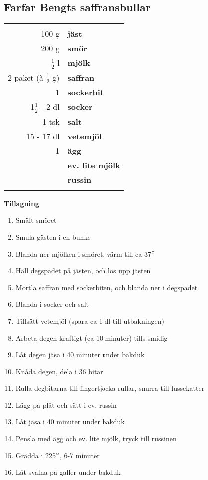 \clearpage

\subsection{Farfar Bengts saffransbullar}

\begin{table}[H]
	\begin{tabular}{rl}
	\hline
	&\\
		100 g & \textbf{jäst} \\
		200 g & \textbf{smör} \\
		$\frac{1}{2}$ l & \textbf{mjölk} \\
		2 paket (à $\frac{1}{2}$ g) & \textbf{saffran} \\
		1 & \textbf{sockerbit} \\
		1$\frac{1}{2}$ - 2 dl & \textbf{socker} \\
		1 tsk & \textbf{salt} \\
		15 - 17 dl & \textbf{vetemjöl} \\
		1 & \textbf{ägg} \\
		& \textbf{ev. lite mjölk} \\
		& \textbf{russin} \\
	&\\
	\hline
	\end{tabular}
\end{table}

\begin{multicols*}{2}

\noindent \textbf{Tillagning}
\begin{enumerate}
	\itemsep0cm
	\item Smält smöret
	\item Smula gästen i en bunke
	\item Blanda ner mjölken i smöret, värm till ca 37$\degree$
	\item Häll degspadet på jästen, och lös upp jästen
	\item Mortla saffran med sockerbiten, och blanda ner i degspadet
	\item	Blanda i socker och salt
	\item Tillsätt vetemjöl (spara ca 1 dl till utbakningen)
	\item Arbeta degen kraftigt (ca 10 \mbox{minuter}) tills smidig
	\item Låt degen jäsa i 40 minuter \mbox{under} bakduk
	\item Knåda degen, dela i 36 bitar
	\item Rulla degbitarna till finger\-tjocka rullar, snurra till \mbox{lussekatter}
	\item Lägg på plåt och sätt i ev. \mbox{russin}
	\item Låt jäsa i 40 minuter under bakduk
	\item Pensla med ägg och ev. lite mjölk, tryck till russinen
	\item Grädda i 225$\degree$,  6-7 minuter
	\item Låt svalna på galler under bakduk
\end{enumerate}

\end{multicols*}

\clearpage